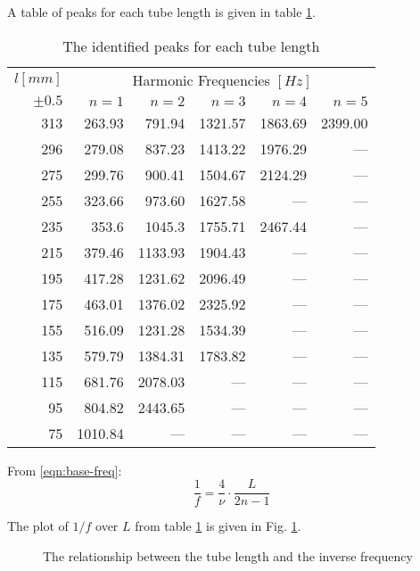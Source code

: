 \documentclass[conference]{IEEEtran}
\newcommand{\NA}{---}
\begin{document}
A table of peaks for each tube length is given in table \ref{tbl:peaks}. 
\begin{table}[t!]
    \caption{The identified peaks for each tube length}
    \label{tbl:peaks}
    \begin{tabular}{r | r r r r r}
        \toprule
        $l [mm]$ & \multicolumn{5}{c}{Harmonic Frequencies $[\si{Hz}]$} \\
        $\pm 0.5$ & $n=1$ & $n=2$ & $n=3$ & $n=4$ & $n=5$ \\
        \midrule
        313 & 263.93 & 791.94 & 1321.57 & 1863.69 & 2399.00 \\
        296 & 279.08 & 837.23 & 1413.22 & 1976.29 & \NA \\
        275 & 299.76 & 900.41 & 1504.67 & 2124.29 & \NA \\
        255 & 323.66 & 973.60 & 1627.58 & \NA & \NA \\
        235 & 353.6 & 1045.3 & 1755.71 & 2467.44 & \NA \\
        215 & 379.46 & 1133.93 & 1904.43 & \NA & \NA \\
        195 & 417.28 & 1231.62 & 2096.49 & \NA & \NA \\
        175 & 463.01 & 1376.02 & 2325.92 & \NA & \NA \\
        155 & 516.09 & 1231.28 & 1534.39 & \NA & \NA \\
        135 & 579.79 & 1384.31 & 1783.82 & \NA & \NA \\
        115 & 681.76 & 2078.03 & \NA & \NA & \NA \\
        95 & 804.82 & 2443.65 & \NA & \NA & \NA \\
        75 & 1010.84 & \NA & \NA & \NA & \NA \\
        \bottomrule
    \end{tabular}
    \centering
\end{table}

From \eqref{eqn:base-freq}:
\begin{equation*}
    \frac{1}{f} = \frac{4}{\nu} \cdot \frac{L}{2n - 1}
\end{equation*}

The plot of $1 / f$ over $L$ from table \ref{tbl:peaks} is given in Fig.
\ref{fig:linplot}.

\begin{figure}[b!]
    \centering

    

    \caption{The relationship between the tube length and the inverse frequency}
    \label{fig:linplot}
\end{figure}
\end{document}
